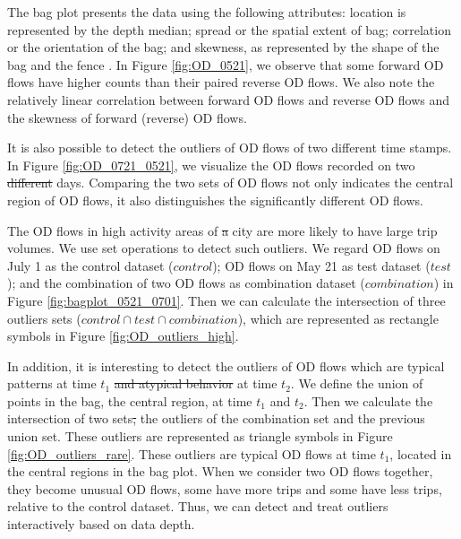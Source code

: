 \documentclass[a4paper,UKenglish]{lipics-v2018}
\providecommand{\DIFadd}[1]{{\protect\color{blue}\uwave{#1}}} %
\providecommand{\DIFdel}[1]{{\protect\color{red}\sout{#1}}}                      %
\providecommand{\DIFaddbegin}{} %
\providecommand{\DIFaddend}{} %
\providecommand{\DIFdelbegin}{} %
\providecommand{\DIFdelend}{} %
\begin{document}
The bag plot presents the data using the following attributes: location is represented by the depth median; spread or the spatial extent of bag; correlation or the orientation of the bag; and skewness, as represented by the shape of the bag and the fence \cite{rousseeuw99AS}.
In Figure \ref{fig:OD_0521}, we observe that some forward OD flows have higher counts than their paired reverse OD flows.
We also note the relatively linear correlation between forward OD flows and reverse OD flows and the skewness of forward (reverse) OD flows. 

It is also possible to detect the outliers of OD flows of two different time stamps.
In Figure \ref{fig:OD_0721_0521}, we visualize the OD flows recorded on two \DIFdelbegin \DIFdel{different }\DIFdelend \DIFaddbegin \DIFadd{separated }\DIFaddend days.
Comparing the two sets of OD flows not only indicates the central region of OD flows, it also distinguishes the significantly different OD flows. 

\DIFdelbegin %

\DIFdelend The OD flows in high activity areas of \DIFdelbegin \DIFdel{a }\DIFdelend \DIFaddbegin \DIFadd{the }\DIFaddend city are more likely to have large trip volumes.
We use set operations to detect such outliers.
We regard OD flows on July 1 as the control dataset ($control$); OD flows on May 21 as test dataset ($test$); and the combination of two OD flows as combination dataset ($combination$) in Figure \ref{fig:bagplot_0521_0701}.
Then we can calculate the intersection of three outliers sets ($control \cap test \cap combination$), which are represented as rectangle symbols in Figure \ref{fig:OD_outliers_high}. 

In addition, it is interesting to detect the outliers of OD flows which are typical patterns at time $t_1$ \DIFdelbegin \DIFdel{and atypical behavior }\DIFdelend \DIFaddbegin \DIFadd{but atypical behaviors }\DIFaddend at time $t_2$.
We define the union of points in the bag, the central region, at time $t_1$ and $t_2$.
Then we calculate the intersection of two sets\DIFdelbegin \DIFdel{, }\DIFdelend \DIFaddbegin \DIFadd{: }\DIFaddend the outliers of the combination set and the previous union set.
These outliers are represented as triangle symbols in Figure \ref{fig:OD_outliers_rare}.
These outliers are typical OD flows at time $t_1$, located in the central regions in the bag plot.
When we consider two OD flows together, they become unusual OD flows, some have more trips and some have less trips, relative to the control dataset.
Thus, we can detect and treat outliers interactively based on data depth.
\end{document}
